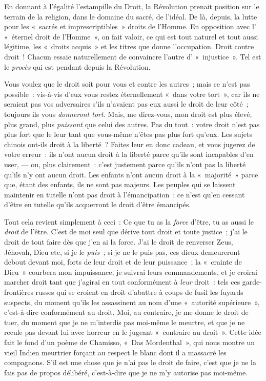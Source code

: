 \documentclass[french,twoside]{book} %
\begin{document}
\noindent En donnant à l’égalité l’estampille du Droit, la Révolution prenait position sur le terrain de la religion, dans le domaine du sacré, de l’idéal. De là, depuis, la lutte pour les « sacrés et imprescriptibles » droits de l’Homme. En opposition avec l’ « éternel droit de l’Homme », on fait valoir, ce qui est tout naturel et tout aussi légitime, les « droits acquis » et les titres que donne l’occupation. Droit contre droit ! Chacun essaie naturellement de convaincre l’autre d’ « injustice ». Tel est le \emph{procès} qui est pendant depuis la Révolution.\par
Vous voulez que le droit soit pour vous et contre les autres ; mais ce n’est pas possible : vis-à-vis d’eux vous restez éternellement « dans votre tort », car ils ne seraient pas vos adversaires s’ils n’avaient pas eux aussi le droit de leur côté ; toujours ils vous \emph{donneront tort.} Mais, me direz-vous, mon droit est plus élevé, plus grand, plus \emph{puissant} que celui des autres. Pas du tout : votre droit n’est pas plus fort que le leur tant que vous-même n’êtes pas plus fort qu’eux. Les sujets chinois ont-ils droit à la liberté ? Faites leur en donc cadeau, et vous jugerez de votre erreur : ils n’ont aucun droit à la liberté parce qu’ils sont incapables d’en user, — ou, plus clairement : c’est justement parce qu’ils n’ont pas la liberté qu’ils n’y ont aucun droit. Les enfants n’ont aucun droit à la « majorité » parce que, étant des enfants, ils ne sont pas majeurs. Les peuples qui se laissent maintenir en tutelle n’ont pas droit à l’émancipation : ce n’est qu’en cessant d’être en tutelle qu’ils acquerront le droit d’être émancipés.\par
Tout cela revient simplement à ceci : Ce que tu as  la \emph{force} d’être, tu as aussi le \emph{droit} de l’être. C’est de moi seul que dérive tout droit et toute justice ; j’ai le droit de tout faire dès que j’en ai la force. J’ai le droit de renverser Zeus, Jéhovah, Dieu etc, si je le \emph{puis ;} si je ne le puis pas, ces dieux demeureront debout devant moi, forts de leur droit et de leur puissance ; la « crainte de Dieu » courbera mon impuissance, je suivrai leurs commandements, et je croirai marcher droit tant que j’agirai en tout conformément à \emph{leur }droit : tels ces garde-frontières russes qui se croient en droit d’abattre à coups de fusil les fuyards suspects, du moment qu’ils les assassinent au nom d’une « autorité supérieure », c’est-à-dire conformément au droit. Moi, au contraire, je me donne le droit de tuer, du moment que je ne m’interdis pas moi-même le meurtre, et que je ne recule pas devant lui avec horreur en le jugeant « contraire au droit ». Cette idée fait le fond d’un poème de Chamisso, « Das Mordenthal », qui nous montre un vieil Indien meurtrier forçant au respect le blanc dont il a massacré les compagnons. S’il est une chose que je n’ai pas le droit de faire, c’est que je ne la fais pas de propos délibéré, c’est-à-dire que je ne m’y autorise pas moi-même.\par
\end{document}
